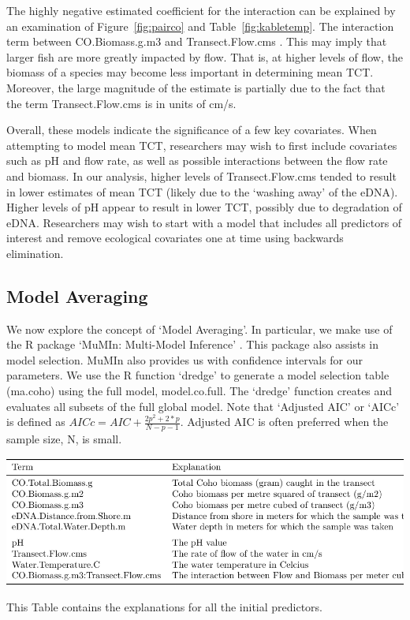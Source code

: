 \vspace{3mm}

The highly negative estimated coefficient for the interaction can be explained by an examination of Figure~\ref{fig:pairco} and Table~\ref{fig:kabletemp}. The interaction term between CO.Biomass.g.m3 and Transect.Flow.cms . This may imply that larger fish are more greatly impacted by flow. That is, at higher levels of flow, the biomass of a species may become less important in determining mean TCT. Moreover, the large magnitude of the estimate is partially due to the fact that the term Transect.Flow.cms is in units of cm/s.

\vspace{3mm}

Overall, these models indicate the significance of a few key covariates. When attempting to model mean TCT, researchers may wish to first include covariates such as pH and flow rate, as well as possible interactions between the flow rate and biomass. In our analysis, higher levels of Transect.Flow.cms tended to result in lower estimates of mean TCT (likely due to the `washing away' of the eDNA). Higher levels of pH appear to result in lower TCT, possibly due to degradation of eDNA. Researchers may wish to start with a model that includes all predictors of interest and  remove ecological covariates one at time using backwards elimination.

\newpage

\subsection{Model Averaging}


We now explore the concept of  `Model Averaging'. In particular, we make use of the R package `MuMIn: Multi-Model Inference' \citep{mumin}. This package also assists in model selection. MuMIn also provides us with confidence intervals for our parameters.  We use the R function `dredge' to generate a model selection table (ma.coho) using the full model, model.co.full. The `dredge' function creates and evaluates all subsets of the full global model. Note that `Adjusted AIC' or `AICc' is defined as $AICc= AIC+ \frac{2p^{2}+2*p}{N-p-1}$. Adjusted AIC is often preferred when the sample size, N, is small.


\begin{table}[H]
\includegraphics{Chapter5Images/termexp.pdf}
\caption{\hspace{1mm} This Table contains the explanations for all the initial predictors.}
\label{fig:termexp}
\end{table}




